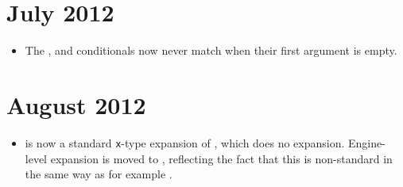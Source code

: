 \documentclass{l3doc}
\begin{document}
\section{July 2012}

\begin{itemize}
  \item The , 
    and  conditionals now never match when
    their first argument is empty.
\end{itemize}

\section{August 2012}

\begin{itemize}
  \item {} is now a standard \texttt{x}-type expansion of
    , which does no expansion. Engine-level expansion is moved
    to , reflecting the fact that this is non-standard in the
    same way as for example .
\end{itemize}
\end{document}
